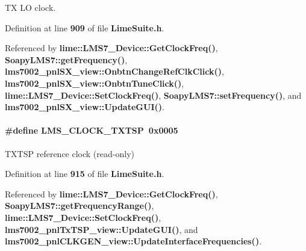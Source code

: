 TX LO clock. 



Definition at line {\bf 909} of file {\bf Lime\+Suite.\+h}.



Referenced by {\bf lime\+::\+L\+M\+S7\+\_\+\+Device\+::\+Get\+Clock\+Freq()}, {\bf Soapy\+L\+M\+S7\+::get\+Frequency()}, {\bf lms7002\+\_\+pnl\+S\+X\+\_\+view\+::\+Onbtn\+Change\+Ref\+Clk\+Click()}, {\bf lms7002\+\_\+pnl\+S\+X\+\_\+view\+::\+Onbtn\+Tune\+Click()}, {\bf lime\+::\+L\+M\+S7\+\_\+\+Device\+::\+Set\+Clock\+Freq()}, {\bf Soapy\+L\+M\+S7\+::set\+Frequency()}, and {\bf lms7002\+\_\+pnl\+S\+X\+\_\+view\+::\+Update\+G\+U\+I()}.

\paragraph[{L\+M\+S\+\_\+\+C\+L\+O\+C\+K\+\_\+\+T\+X\+T\+SP}]{\setlength{\rightskip}{0pt plus 5cm}\#define L\+M\+S\+\_\+\+C\+L\+O\+C\+K\+\_\+\+T\+X\+T\+SP~0x0005}\label{group__LMS__CLOCK__ID_ga1b52330283adbc22c63d18497ac7226a}


T\+X\+T\+SP reference clock (read-\/only) 



Definition at line {\bf 915} of file {\bf Lime\+Suite.\+h}.



Referenced by {\bf lime\+::\+L\+M\+S7\+\_\+\+Device\+::\+Get\+Clock\+Freq()}, {\bf Soapy\+L\+M\+S7\+::get\+Frequency\+Range()}, {\bf lime\+::\+L\+M\+S7\+\_\+\+Device\+::\+Set\+Clock\+Freq()}, {\bf lms7002\+\_\+pnl\+Tx\+T\+S\+P\+\_\+view\+::\+Update\+G\+U\+I()}, and {\bf lms7002\+\_\+pnl\+C\+L\+K\+G\+E\+N\+\_\+view\+::\+Update\+Interface\+Frequencies()}.

